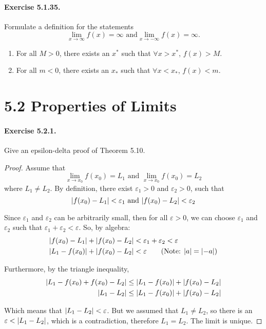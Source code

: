 \documentclass[11pt]{article}
\DeclarePairedDelimiter{\abs}{\lvert}{\rvert}
\def \epsilon {\varepsilon}
\def \limitToXZero {\lim_{x \to x_0}}
\begin{document}
\paragraph{Exercise 5.1.35.} Formulate a definition for the statements
\[ \lim_{x \rightarrow \infty} f(x) = \infty \text{ and} \lim_{x \rightarrow -\infty} f(x) = \infty. \]

\begin{enumerate}
	\item For all $ M > 0 $, there exists an $ x^* $ such that $ \forall x > x^* $, $ f(x) > M $.
	\item For all $ m < 0 $, there exists an $ x_* $ such that $ \forall x < x_* $, $ f(x) < m $.
\end{enumerate}


\section*{5.2 Properties of Limits}
\paragraph{Exercise 5.2.1.} Give an epsilon-delta proof of Theorem 5.10.
	
\begin{proof}
	Assume that 
		$$ \limitToXZero f(x_0) = L_1  \text{ and } \limitToXZero f(x_0) = L_2 $$
	where $ L_1 \ne L_2 $. By definition, there exist $ \epsilon_1 > 0 $ and $ \epsilon_2 > 0 $, such that
		$$ \abs{f(x_0) - L_1} < \epsilon_1  \text{ and } \abs{f(x_0) - L_2} < \epsilon_2 $$

	Since $ \epsilon_1 $ and $ \epsilon_2 $ can be arbitrarily small, then for all $\epsilon > 0$, we can choose $ \epsilon_1 $ and $ \epsilon_2 $ such that $\epsilon_1 + \epsilon_2 < \epsilon$.
	So, by algebra:
	\begin{align*}
		\abs{f(x_0) - L_1} + \abs{f(x_0) - L_2} &< \epsilon_1 + \epsilon_2 < \epsilon\\
		\abs{L_1 - f(x_0)} + \abs{f(x_0) - L_2} &< \epsilon \tag{Note: $ \abs{a} = \abs{-a} $}
	\end{align*}
	
	Furthermore, by the triangle inequality, 
	\begin{align*}
		\abs{L_1 - f(x_0) + f(x_0) - L_2} &\leq \abs{L_1 - f(x_0)} + \abs{f(x_0) - L_2} \\
		\abs{L_1 - L_2} &\leq \abs{L_1 - f(x_0)} + \abs{f(x_0) - L_2} \\
	\end{align*}

	Which means that $ \abs{L_1 - L_2} < \epsilon $. But we assumed that $L_1 \ne L_2$, so there is an $\epsilon < \abs{L_1 - L_2}$, which is a contradiction, therefore $L_1 = L_2$. The limit is unique.
	
\end{proof}
\end{document}
